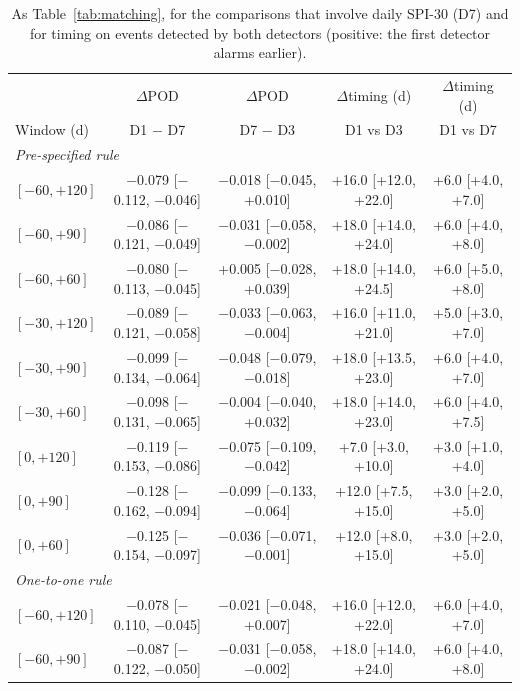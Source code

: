 \begin{table}[tbp]
\caption{As Table~\ref{tab:matching}, for the comparisons that involve daily SPI-30 (D7) and for timing on
events detected by both detectors (positive: the first detector alarms earlier).}
\label{tab:matchingb}
\footnotesize\setlength{\tabcolsep}{2pt}
\begin{tabular*}{\textwidth}{@{\extracolsep\fill}lcccc}
\toprule
& $\Delta$POD & $\Delta$POD & $\Delta$timing (d) & $\Delta$timing (d)\\
Window (d) & D1 $-$ D7 & D7 $-$ D3 & D1 vs D3 & D1 vs D7\\
\midrule
\multicolumn{5}{l}{\textit{Pre-specified rule}}\\
$[{-}60,+120]$ & $-$0.079 [$-$0.112, $-$0.046] & $-$0.018 [$-$0.045, +0.010] & +16.0 [+12.0, +22.0] & +6.0 [+4.0, +7.0] \\
$[{-}60,+90]$ & $-$0.086 [$-$0.121, $-$0.049] & $-$0.031 [$-$0.058, $-$0.002] & +18.0 [+14.0, +24.0] & +6.0 [+4.0, +8.0] \\
$[{-}60,+60]$ & $-$0.080 [$-$0.113, $-$0.045] & +0.005 [$-$0.028, +0.039] & +18.0 [+14.0, +24.5] & +6.0 [+5.0, +8.0] \\
$[{-}30,+120]$ & $-$0.089 [$-$0.121, $-$0.058] & $-$0.033 [$-$0.063, $-$0.004] & +16.0 [+11.0, +21.0] & +5.0 [+3.0, +7.0] \\
$[{-}30,+90]$ & $-$0.099 [$-$0.134, $-$0.064] & $-$0.048 [$-$0.079, $-$0.018] & +18.0 [+13.5, +23.0] & +6.0 [+4.0, +7.0] \\
$[{-}30,+60]$ & $-$0.098 [$-$0.131, $-$0.065] & $-$0.004 [$-$0.040, +0.032] & +18.0 [+14.0, +23.0] & +6.0 [+4.0, +7.5] \\
$[0,+120]$ & $-$0.119 [$-$0.153, $-$0.086] & $-$0.075 [$-$0.109, $-$0.042] & +7.0 [+3.0, +10.0] & +3.0 [+1.0, +4.0] \\
$[0,+90]$ & $-$0.128 [$-$0.162, $-$0.094] & $-$0.099 [$-$0.133, $-$0.064] & +12.0 [+7.5, +15.0] & +3.0 [+2.0, +5.0] \\
$[0,+60]$ & $-$0.125 [$-$0.154, $-$0.097] & $-$0.036 [$-$0.071, $-$0.001] & +12.0 [+8.0, +15.0] & +3.0 [+2.0, +5.0] \\
\midrule
\multicolumn{5}{l}{\textit{One-to-one rule}}\\
$[{-}60,+120]$ & $-$0.078 [$-$0.110, $-$0.045] & $-$0.021 [$-$0.048, +0.007] & +16.0 [+12.0, +22.0] & +6.0 [+4.0, +7.0] \\
$[{-}60,+90]$ & $-$0.087 [$-$0.122, $-$0.050] & $-$0.031 [$-$0.058, $-$0.002] & +18.0 [+14.0, +24.0] & +6.0 [+4.0, +8.0] \\

\end{tabular*}
\end{table}

